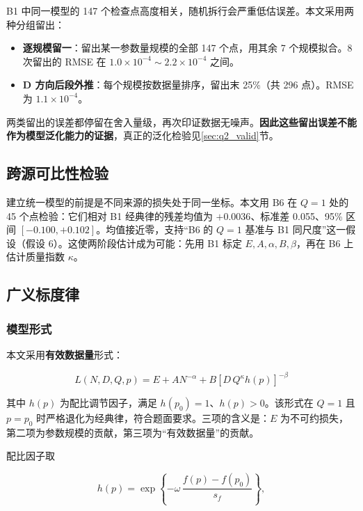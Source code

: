 B1 中同一模型的 147 个检查点高度相关，随机拆行会严重低估误差。本文采用两种分组留出：

\begin{itemize}[leftmargin=2em,itemsep=2pt]
\item \textbf{逐规模留一}：留出某一参数量规模的全部 147 个点，用其余 7 个规模拟合。8 次留出的 RMSE 在 $1.0\times10^{-4}\sim2.2\times10^{-4}$ 之间。
\item \textbf{D 方向后段外推}：每个规模按数据量排序，留出末 25\%（共 296 点）。RMSE 为 $1.1\times10^{-4}$。
\end{itemize}

两类留出的误差都停留在舍入量级，再次印证数据无噪声。\textbf{因此这些留出误差不能作为模型泛化能力的证据}，真正的泛化检验见\ref{sec:q2_valid}节。

\subsection{跨源可比性检验}

建立统一模型的前提是不同来源的损失处于同一坐标。本文用 B6 在 $Q=1$ 处的 45 个点检验：它们相对 B1 经典律的残差均值为 $+0.0036$、标准差 0.055、95\% 区间 $[-0.100,+0.102]$。均值接近零，支持``B6 的 $Q=1$ 基准与 B1 同尺度''这一假设（假设 6）。这使两阶段估计成为可能：先用 B1 标定 $E,A,\alpha,B,\beta$，再在 B6 上估计质量指数 $\kappa$。

\subsection{广义标度律}

\subsubsection{模型形式}

本文采用\textbf{有效数据量}形式：

\begin{equation}
\boxed{\,L(N,D,Q,p)=E+AN^{-\alpha}+B\left[D\,Q^{\kappa}h(p)\right]^{-\beta}\,}
\label{eq:general}
\end{equation}

其中 $h(p)$ 为配比调节因子，满足 $h(p_0)=1$、$h(p)>0$。该形式在 $Q=1$ 且 $p=p_0$ 时严格退化为经典律，符合题面要求。三项的含义是：$E$ 为不可约损失，第二项为参数规模的贡献，第三项为``有效数据量''的贡献。

配比因子取

\begin{equation}
h(p)=\exp\!\left\{-\omega\,\frac{f(p)-f(p_0)}{s_f}\right\},
\end{equation}

